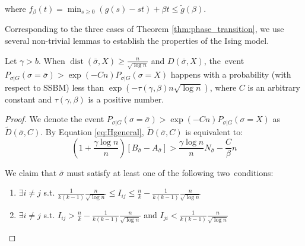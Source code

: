 \documentclass[entropy,article,accept,moreauthors,pdftex]{Definitions/mdpi}
\newcommand{\1}{\mathbbm{1}}
\DeclareMathOperator{\Dist}{dist}
\begin{document}
\begin{paracol}{2}
\begin{Lemma}
	where $f_{\beta}(t) = \min_{s\geq 0} (g(s) - st) + \beta t \leq \tilde{g}(\beta) $.
\end{Lemma}
Corresponding to the three cases of Theorem \ref{thm:phase_transition}, we use several non-trivial lemmas to 
establish the properties of the Ising model.
\begin{Lemma}\label{lem:sigmaX}
	Let $\gamma > b$. When $\Dist(\bar{\sigma}, X) \geq \frac{n}{\sqrt{\log n}}$ and $D(\bar{\sigma}, X)$, the~event\linebreak
	$P_{\sigma | G}(\sigma = \bar{\sigma} ) > \exp(-Cn) P_{\sigma | G}(\sigma = X)$
	happens with a probability (with respect to %
	SSBM) less than $\exp(-\tau(\gamma,\beta) n \sqrt{\log  n} )$,
	where $C$ is an arbitrary constant and $\tau(\gamma, \beta)$
	is a positive number.
\end{Lemma}
\begin{proof}
	We denote the event $P_{\sigma | G}(\sigma = \bar{\sigma} ) > \exp(-Cn) P_{\sigma | G}(\sigma = X)$ as $\widetilde{D}(\bar{\sigma}, C)$.
	By Equation \eqref{eq:Hgeneral}, $\widetilde{D}(\bar{\sigma}, C)$
	is equivalent to:
\begin{equation}\label{eq:BwA}
	(1 + \frac{\gamma \log n}{n})[B_{\bar{\sigma}} - A_{\bar{\sigma}}] >  \frac{\gamma \log n}{n} N_{\bar{\sigma}}  - \frac{C}{\beta} n
	\end{equation}
	
	We claim that $\bar{\sigma}$ must satisfy at least one of the following two~conditions:
	\begin{enumerate}
		\item $\exists i\neq j$ s.t. $\frac{1}{k(k-1)}\frac{n}{\sqrt{\log n}} \leq I_{ij} \leq \frac{n}{k} - \frac{1}{k(k-1)}\frac{n}{\sqrt{\log n}}$
		\item $\exists i \neq j$ s.t. $I_{ij} > \frac{n}{k} - \frac{1}{k(k-1)}\frac{n}{\sqrt{\log n}}$ and $I_{ji} < \frac{1}{k(k-1)}\frac{n}{\sqrt{\log n}}$
	\end{enumerate}
	

\end{proof}
\end{paracol}
\end{document}
